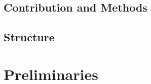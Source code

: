 \documentclass{article}      %
\newcommand\todo[1]{\textcolor{blue}{#1}}
\begin{document}


\subsection{Contribution and Methods}
\label{sec:cont-meth}


\subsection{Structure}
\label{sec:struct}


\pagebreak
\section{Preliminaries}
\label{sec:prelim}
\end{document}
